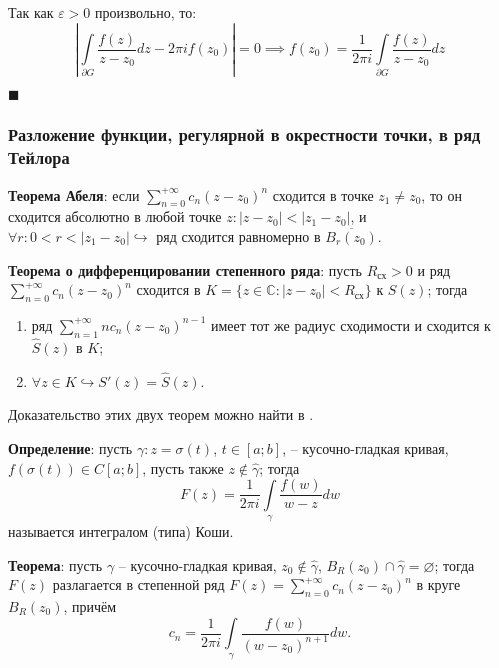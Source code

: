 \documentclass[12pt, a4paper, reqno]{article}
\begin{document}
    Так как $\varepsilon > 0$ произвольно, то:
    \begin{equation*}
        \left|\int\limits_{\partial G}\frac{f(z)}{z - z_0}dz - 2\pi i f(z_0)\right| = 0 \implies
        f(z_0) = \frac{1}{2\pi i}\int\limits_{\partial G}\frac{f(z)}{z - z_0}dz
    \end{equation*}

    $\blacksquare$

    \subsubsection{Разложение функции, регулярной в окрестности точки, в ряд Тейлора}

    \textbf{Теорема Абеля}: если $\sum\limits_{n = 0}^{+\infty} c_n (z - z_0)^n$ сходится в точке
    $z_1 \neq z_0$, то он сходится абсолютно в любой точке $z: |z - z_0| < |z_1 - z_0|$, и
    $\forall r: 0 < r < |z_1 - z_0| \hookrightarrow$ ряд сходится равномерно в $\overline{B_r(z_0)}$.

    \textbf{Теорема о дифференцировании степенного ряда}: пусть $R_{\textbf{сх}} > 0$ и ряд
    $\sum\limits_{n = 0}^{+\infty} c_n (z - z_0)^n$ сходится в
    $K = \{z \in \mathbb{C}: |z - z_0| < R_{\textbf{сх}}\}$ к $S(z)$; тогда
    \begin{enumerate}
        \item ряд $\sum\limits_{n = 1}^{+\infty} n c_n (z - z_0)^{n - 1}$ имеет тот же радиус
              сходимости и сходится к $\hat{S}(z)$ в $K$;
        \item $\forall z \in K \hookrightarrow S'(z) = \hat{S}(z)$.
    \end{enumerate}

    Доказательство этих двух теорем можно найти в \cite{bunakov}.

    \textbf{Определение}: пусть $\gamma: z = \sigma(t)$, $t \in [a; b]$, -- кусочно-гладкая кривая,
    $f(\sigma(t)) \in C[a; b]$, пусть также $z \not\in \hat{\gamma}$; тогда
    \begin{equation*}
        F(z) = \frac{1}{2\pi i}\int\limits_{\gamma} \frac{f(w)}{w - z}dw
    \end{equation*}
    называется интегралом (типа) Коши.

    \textbf{Теорема}: пусть $\gamma$ -- кусочно-гладкая кривая, $z_0 \not\in \hat{\gamma}$,
    $B_{R}(z_0) \cap \hat{\gamma} = \varnothing$; тогда $F(z)$ разлагается в степенной ряд
    $F(z) = \sum\limits_{n = 0}^{+\infty} c_n(z - z_0)^n$ в круге $B_{R}(z_0)$, причём
    \begin{equation*}
        c_n = \frac{1}{2\pi i}\int\limits_{\gamma}\frac{f(w)}{(w - z_0)^{n + 1}}dw.
    \end{equation*}
\end{document}
